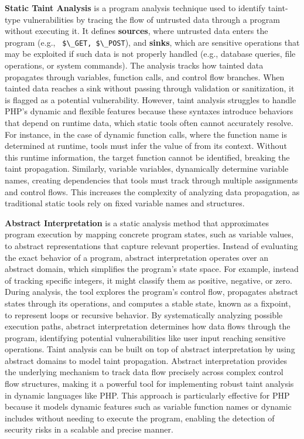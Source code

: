 \textbf{Static Taint Analysis} is a program analysis technique used to identify taint-type vulnerabilities by tracing the flow of untrusted data through a program without executing it. It defines \textbf{sources}, where untrusted data enters the program (e.g., \lstinline[language=myPHP]| $\_GET, $\_POST|), and \textbf{sinks}, which are sensitive operations that may be exploited if such data is not properly handled (e.g., database queries, file operations, or system commands). The analysis tracks how tainted data propagates through variables, function calls, and control flow branches. When tainted data reaches a sink without passing through validation or sanitization, it is flagged as a potential vulnerability. 
However, taint analysis struggles to handle PHP’s dynamic and flexible features because these syntaxes introduce behaviors that depend on runtime data, which static tools often cannot accurately resolve. For instance, in the case of dynamic function calls, where the function name is determined at runtime, tools must infer the value of from its context. Without this runtime information, the target function cannot be identified, breaking the taint propagation. Similarly, variable variables, dynamically determine variable names, creating dependencies that tools must track through multiple assignments and control flows. This increases the complexity of analyzing data propagation, as traditional static tools rely on fixed variable names and structures. 

\textbf{Abstract Interpretation} is a static analysis method that approximates program execution by mapping concrete program states, such as variable values, to abstract representations that capture relevant properties. 
Instead of evaluating the exact behavior of a program, abstract interpretation operates over an abstract domain, which simplifies the program’s state space. For example, instead of tracking specific integers, it might classify them as positive, negative, or zero. During analysis, the tool explores the program's control flow, propagates abstract states through its operations, and computes a stable state, known as a fixpoint, to represent loops or recursive behavior. By systematically analyzing  possible execution paths, abstract interpretation determines how data flows through the program, identifying potential vulnerabilities like user input reaching sensitive operations. 
Taint analysis can be built on top of abstract interpretation by using abstract domains to model taint propagation. Abstract interpretation provides the underlying mechanism to track data flow precisely across complex control flow structures, making it a powerful tool for implementing robust taint analysis in dynamic languages like PHP. This approach is particularly effective for PHP because it models dynamic features such as variable function names or dynamic includes without needing to execute the program, enabling the detection of security risks in a scalable and precise manner.

